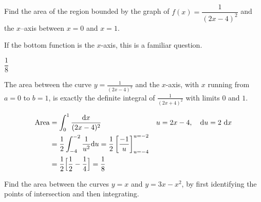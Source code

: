 \subsection*{\Procedural}



\begin{Mquestion}[M105 2013A]
Find the area of the region bounded by the graph of
$f (x) = \dfrac{1}{(2x-4)^2}$ and the $x$--axis
between $x = 0$ and $x = 1$.
\end{Mquestion}

\begin{hint}
If the bottom function is the $x$-axis, this is a familiar question.
\end{hint}

\begin{answer}
$\dfrac{1}{8}$
\end{answer}

\begin{solution}
\begin{center}
\end{center}

The area between the curve $y= \frac{1}{(2x-4)^2}$
and the $x$-axis, with $x$ running from $a=0$ to
$b=1$, is exactly the definite integral of $\frac{1}{(2x+4)^2}$ with limits $0$ and $1$.

\begin{align*}
\mbox{Area}&=\int_0^1 \frac{\mathrm{d}x}{(2x-4)^2}&u=2x-4,\quad\mathrm{d}u=2\ \mathrm{d}x\\
&=\frac{1}{2}\int_{-4}^{-2}\frac{1}{u^2}\mathrm{d}u = \frac{1}{2}\left[\frac{-1}{u}\right]_{u=-4}^{u=-2}\\
&=\frac{1}{2}\Big[\frac{1}{2}-\frac{1}{4}\Big]
=\frac{1}{8}
\end{align*}

\end{solution}

\begin{question}[2016Q2]
Find the area between the curves $y=x$ and $y=3x-x^2$, by first identifying the points of intersection and then integrating.
\end{question}

